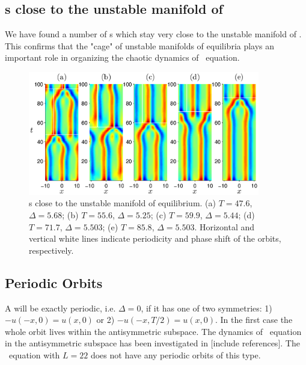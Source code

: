 \subsection{\Rpo s close to the unstable manifold of  }
We have found a number of \rpo s which stay very close to the
unstable manifold of .  This confirms that the "cage" of
unstable manifolds of equilibria plays an important role in
organizing the chaotic dynamics of \KS\ equation.

\begin{figure}[t]
\begin{center}
\includegraphics[width=0.9\textwidth]{figs/ks22rposCage.eps}
\end{center}
\caption{\Rpo s close to the unstable manifold of 
equilibrium. (a) $T = 47.6$, $\Delta = 5.68$; (b) $T = 55.6$,
$\Delta = 5.25$; (c) $T = 59.9$, $\Delta = 5.44$; (d) $T = 71.7$,
$\Delta = 5.503$; (e) $T = 85.8$, $\Delta = 5.503$. Horizontal and
vertical white lines indicate periodicity and phase shift of the
orbits, respectively. }\label{f:ks22rposCage}
\end{figure}

\subsection{Periodic Orbits} \label{ssec:po}
A \rpo will be exactly periodic, i.e. $\Delta = 0$, if it has one of
two symmetries: 1) $-u(-x,0) = u(x,0)$ or 2) $-u(-x,T/2) =
u(x,0)$. In the
first case the whole orbit lives within the antisymmetric subspace.
The dynamics of \KS\ equation in the antisymmetric subspace has been
investigated in [include references]. The \KS\ equation with $L =
22$ does not have any periodic orbits of this type.

